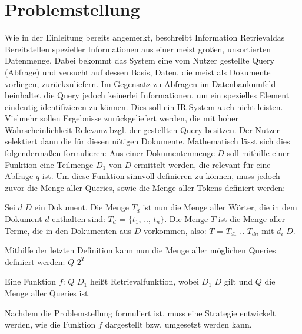 \section{Problemstellung}
Wie in der Einleitung bereits angemerkt, beschreibt \glqq Information Retrieval\grqq das Bereitstellen spezieller Informationen aus einer meist großen, unsortierten Datenmenge. Dabei bekommt das System eine vom Nutzer gestellte Query (Abfrage) und versucht auf dessen Basis, Daten, die meist als Dokumente vorliegen, zurückzuliefern.
Im Gegensatz zu Abfragen im Datenbankumfeld beinhaltet die Query jedoch keinerlei Informationen, um ein spezielles Element eindeutig identifizieren zu können. Dies soll ein IR-System auch nicht leisten. Vielmehr sollen Ergebnisse zurückgeliefert werden, die mit hoher Wahrscheinlichkeit Relevanz bzgl. der gestellten Query besitzen. Der Nutzer selektiert dann die für diesen nötigen Dokumente.
\newline
Mathematisch lässt sich dies folgendermaßen formulieren:
Aus einer Dokumentenmenge $D$ soll mithilfe einer Funktion eine Teilmenge $D_1$ von $D$ ermittelt werden, die relevant für eine Abfrage $q$ ist.
\newline
Um diese Funktion sinnvoll definieren zu können, muss jedoch zuvor die Menge aller Queries, sowie die Menge aller Tokens definiert werden:
\begin{defi}
	Sei $d$ \in $D$ ein Dokument. Die Menge $T_d$ ist nun die Menge aller Wörter, die in dem Dokument $d$ enthalten sind: $T_d$ = $\{$$t_1$, .., $t_n$$\}$.
	\newline
	Die Menge $T$ ist die Menge aller Terme, die in den Dokumenten aus $D$ vorkommen, also:
	$T$ = $T_{d1}$ \cup .. \cup $T_{dn}$ mit $d_i$ \in $D$.
\end{defi}

\begin{defi}
	Mithilfe der letzten Definition kann nun die Menge aller möglichen Queries definiert werden:
	$Q$ \subseteq $2^T$
\end{defi}

\begin{defi}
	Eine Funktion $f$: $Q$ \rightarrow $D_1$ heißt Retrievalfunktion, wobei $D_1$ \subseteq $D$ gilt und $Q$ die Menge aller Queries ist.
\end{defi}

Nachdem die Problemstellung formuliert ist, muss eine Strategie entwickelt werden, wie die Funktion $f$ dargestellt bzw. umgesetzt werden kann.

\newpage

